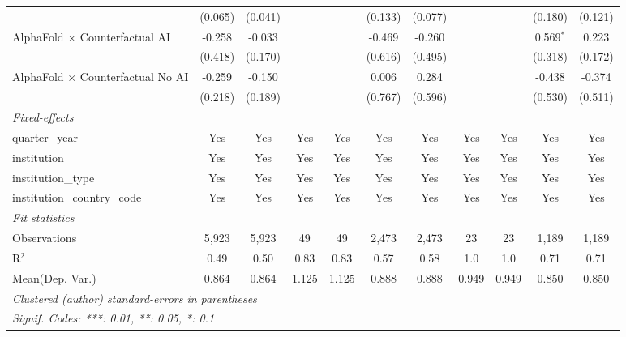 \begin{tabular}{lcccccccccc}
                                            & (0.065)       & (0.041)       &              &              & (0.133)     & (0.077)       &              &              & (0.180)     & (0.121)\\   
   AlphaFold $\times$ Counterfactual AI     & -0.258        & -0.033        &              &              & -0.469      & -0.260        &              &              & 0.569$^{*}$ & 0.223\\   
                                            & (0.418)       & (0.170)       &              &              & (0.616)     & (0.495)       &              &              & (0.318)     & (0.172)\\   
   AlphaFold $\times$ Counterfactual No AI  & -0.259        & -0.150        &              &              & 0.006       & 0.284         &              &              & -0.438      & -0.374\\   
                                            & (0.218)       & (0.189)       &              &              & (0.767)     & (0.596)       &              &              & (0.530)     & (0.511)\\   
   \midrule
   \emph{Fixed-effects}\\
   quarter\_year                            & Yes           & Yes           & Yes          & Yes          & Yes         & Yes           & Yes          & Yes          & Yes         & Yes\\  
   institution                              & Yes           & Yes           & Yes          & Yes          & Yes         & Yes           & Yes          & Yes          & Yes         & Yes\\  
   institution\_type                        & Yes           & Yes           & Yes          & Yes          & Yes         & Yes           & Yes          & Yes          & Yes         & Yes\\  
   institution\_country\_code               & Yes           & Yes           & Yes          & Yes          & Yes         & Yes           & Yes          & Yes          & Yes         & Yes\\  
   \midrule
   \emph{Fit statistics}\\
   Observations                             & 5,923         & 5,923         & 49           & 49           & 2,473       & 2,473         & 23           & 23           & 1,189       & 1,189\\  
   R$^2$                                    & 0.49          & 0.50          & 0.83         & 0.83         & 0.57        & 0.58          & 1.0          & 1.0          & 0.71        & 0.71\\  
Mean(Dep. Var.) & 0.864 & 0.864 & 1.125 & 1.125 & 0.888 & 0.888 & 0.949 & 0.949 & 0.850 & 0.850 \\
   \midrule \midrule
   \multicolumn{11}{l}{\emph{Clustered (author) standard-errors in parentheses}}\\
   \multicolumn{11}{l}{\emph{Signif. Codes: ***: 0.01, **: 0.05, *: 0.1}}\\
\end{tabular}
\par\endgroup
